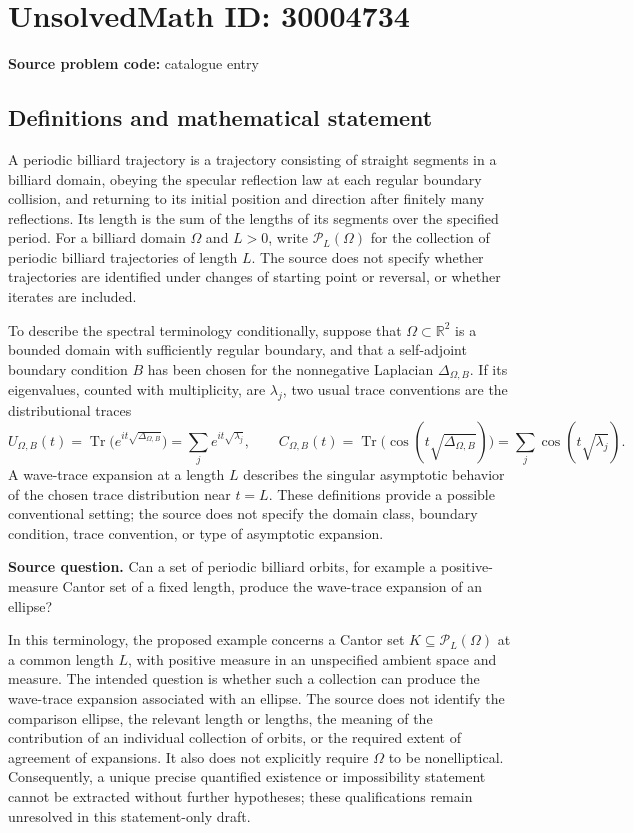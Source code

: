 \documentclass[11pt]{article}
\newcommand{\R}{\mathbb{R}}
\begin{document}
\section*{UnsolvedMath ID: 30004734}
\textbf{Source problem code:} catalogue entry
\subsection{Definitions and mathematical statement}
A periodic billiard trajectory is a trajectory consisting of straight segments in a billiard domain, obeying the specular reflection law at each regular boundary collision, and returning to its initial position and direction after finitely many reflections. Its length is the sum of the lengths of its segments over the specified period. For a billiard domain \(\Omega\) and \(L>0\), write \(\mathcal P_L(\Omega)\) for the collection of periodic billiard trajectories of length \(L\). The source does not specify whether trajectories are identified under changes of starting point or reversal, or whether iterates are included.

To describe the spectral terminology conditionally, suppose that \(\Omega\subset\R^2\) is a bounded domain with sufficiently regular boundary, and that a self-adjoint boundary condition \(B\) has been chosen for the nonnegative Laplacian \(\Delta_{\Omega,B}\). If its eigenvalues, counted with multiplicity, are \(\lambda_j\), two usual trace conventions are the distributional traces
\[
U_{\Omega,B}(t)=\operatorname{Tr}\bigl(e^{it\sqrt{\Delta_{\Omega,B}}}\bigr)=\sum_j e^{it\sqrt{\lambda_j}},
\qquad
C_{\Omega,B}(t)=\operatorname{Tr}\bigl(\cos(t\sqrt{\Delta_{\Omega,B}})\bigr)=\sum_j\cos(t\sqrt{\lambda_j}).
\]
A wave-trace expansion at a length \(L\) describes the singular asymptotic behavior of the chosen trace distribution near \(t=L\). These definitions provide a possible conventional setting; the source does not specify the domain class, boundary condition, trace convention, or type of asymptotic expansion.

\textbf{Source question.} Can a set of periodic billiard orbits, for example a positive-measure Cantor set of a fixed length, produce the wave-trace expansion of an ellipse?

In this terminology, the proposed example concerns a Cantor set \(K\subseteq\mathcal P_L(\Omega)\) at a common length \(L\), with positive measure in an unspecified ambient space and measure. The intended question is whether such a collection can produce the wave-trace expansion associated with an ellipse. The source does not identify the comparison ellipse, the relevant length or lengths, the meaning of the contribution of an individual collection of orbits, or the required extent of agreement of expansions. It also does not explicitly require \(\Omega\) to be nonelliptical. Consequently, a unique precise quantified existence or impossibility statement cannot be extracted without further hypotheses; these qualifications remain unresolved in this statement-only draft.
\end{document}
